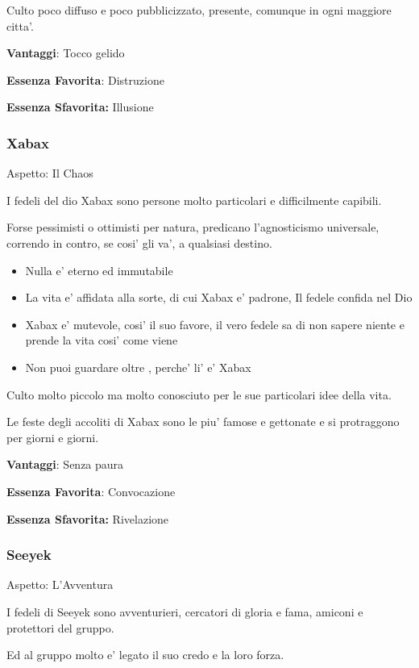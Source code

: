 \documentclass[a4paper,11pt,twoside,openany]{book}
\begin{document}
Culto poco diffuso e poco pubblicizzato, presente, comunque in ogni maggiore citta'.


\textbf{Vantaggi}: Tocco gelido

\textbf{Essenza Favorita}: Distruzione

\textbf{Essenza Sfavorita:} Illusione
\bigskip


\subsubsection{Xabax}

Aspetto: Il Chaos
\bigskip

I fedeli del dio Xabax sono persone molto particolari e difficilmente capibili.

Forse pessimisti o ottimisti per natura, predicano l'agnosticismo universale, correndo in contro, se cosi' gli va', a qualsiasi destino.


\begin{itemize}
	\item Nulla e' eterno ed immutabile
	\item La vita e' affidata alla sorte, di cui Xabax e' padrone, Il fedele confida nel Dio
	\item Xabax e' mutevole, cosi' il suo favore, il vero fedele sa di non sapere niente e prende la vita cosi' come viene
	\item Non puoi guardare oltre , perche' li' e' Xabax
\end{itemize}

Culto molto piccolo ma molto conosciuto per le sue particolari idee della vita.

Le feste degli accoliti di Xabax sono le piu' famose e gettonate e si protraggono per giorni e giorni.


\textbf{Vantaggi}: Senza paura

\textbf{Essenza Favorita}: Convocazione

\textbf{Essenza Sfavorita:} Rivelazione
\bigskip

\subsubsection{Seeyek}

Aspetto: L'Avventura
\bigskip

I fedeli di Seeyek sono avventurieri, cercatori di gloria e fama, amiconi e protettori del gruppo.

Ed al gruppo molto e' legato il suo credo e la loro forza.
\end{document}
